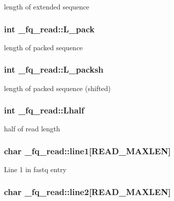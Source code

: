 length of extended sequence \hypertarget{struct__fq__read_a84f64405e7a9bbc055dd4f5534041782}{
\subsubsection[{L\+\_\+pack}]{\setlength{\rightskip}{0pt plus 5cm}int \+\_\+fq\+\_\+read\+::\+L\+\_\+pack}}\label{struct__fq__read_a84f64405e7a9bbc055dd4f5534041782}
length of packed sequence \hypertarget{struct__fq__read_a1303e633bdb4a7e31083d849a92fcbcc}{
\subsubsection[{L\+\_\+packsh}]{\setlength{\rightskip}{0pt plus 5cm}int \+\_\+fq\+\_\+read\+::\+L\+\_\+packsh}}\label{struct__fq__read_a1303e633bdb4a7e31083d849a92fcbcc}
length of packed sequence (shifted) \hypertarget{struct__fq__read_a9cf08b81f1e78553e08fb597d30192b6}{
\subsubsection[{Lhalf}]{\setlength{\rightskip}{0pt plus 5cm}int \+\_\+fq\+\_\+read\+::\+Lhalf}}\label{struct__fq__read_a9cf08b81f1e78553e08fb597d30192b6}
half of read length \hypertarget{struct__fq__read_a7a643c49516b3a35f221d0fcda7f9ff3}{
\subsubsection[{line1}]{\setlength{\rightskip}{0pt plus 5cm}char \+\_\+fq\+\_\+read\+::line1\mbox{[}R\+E\+A\+D\+\_\+\+M\+A\+X\+L\+E\+N\mbox{]}}}\label{struct__fq__read_a7a643c49516b3a35f221d0fcda7f9ff3}
Line 1 in fastq entry \hypertarget{struct__fq__read_af2502a6f97e9508936c1b9f08890cc84}{
\subsubsection[{line2}]{\setlength{\rightskip}{0pt plus 5cm}char \+\_\+fq\+\_\+read\+::line2\mbox{[}R\+E\+A\+D\+\_\+\+M\+A\+X\+L\+E\+N\mbox{]}}}\label{struct__fq__read_af2502a6f97e9508936c1b9f08890cc84}
